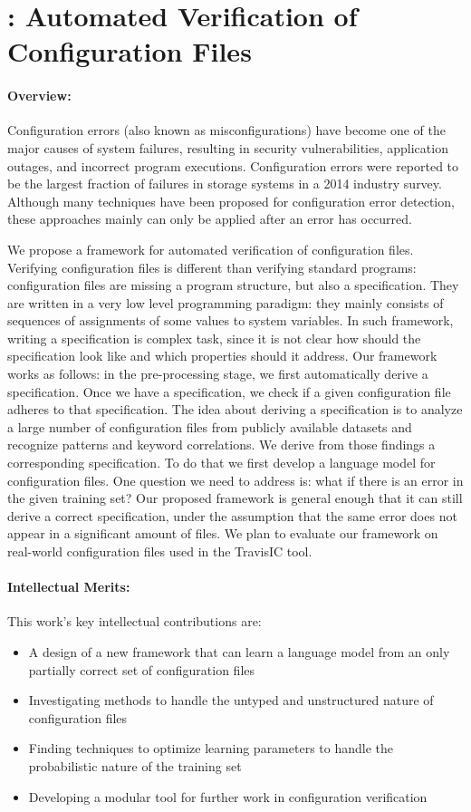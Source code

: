 \section*{\app: Automated Verification of Configuration Files}
\paragraph{Overview:} 
Configuration errors (also known as misconfigurations) have become one of the major causes of system failures, resulting in security vulnerabilities, application outages, and incorrect program executions. 
Configuration errors were reported to be the largest fraction of failures in storage systems in a 2014 industry survey. 
Although many techniques have been proposed for configuration error detection, these approaches mainly can only be applied after an error has occurred.

We propose a framework for automated verification of configuration files. 
Verifying configuration files is different than verifying standard programs: configuration
files are missing a program structure, but also a specification. They are written in a
very low level programming paradigm: they mainly consists of sequences of assignments 
of some 
values to system variables. In such framework, writing a specification is complex task, 
since it is not clear how should the specification look like and which properties should 
it address. Our framework works as follows: in the pre-processing stage, 
we first automatically derive a specification. Once we have a specification, 
we check if a given configuration 
file adheres to that specification.
The idea about deriving a specification is to analyze a large number of configuration files from publicly available 
datasets and recognize patterns and keyword correlations. We derive from those findings 
a corresponding specification. To do that we first develop a language model for configuration files. One question we 
need to address is: what if there is an error in the given training set? Our proposed framework 
is general enough that it can still derive a correct specification, under 
the assumption that the same error does not appear in a significant amount of files.
We plan to evaluate our framework on real-world configuration files 
used in the TravisIC tool.

\paragraph{Intellectual Merits:} This work's key intellectual contributions are:
\begin{itemize}
\item A design of a new framework that can learn a language model from an only partially correct set of configuration files
\item Investigating methods to handle the untyped and unstructured nature of configuration files
\item Finding techniques to optimize learning parameters to handle the probabilistic nature of the training set
\item Developing a modular tool for further work in configuration verification
\end{itemize}


